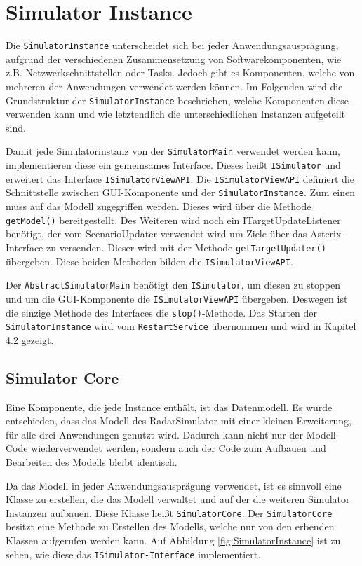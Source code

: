 \section{Simulator Instance}
Die \texttt{SimulatorInstance} unterscheidet sich bei jeder Anwendungsausprägung, aufgrund der verschiedenen Zusammensetzung von Softwarekomponenten, wie z.B. Netzwerkschnittstellen oder Tasks. Jedoch gibt es Komponenten, welche von mehreren der Anwendungen verwendet werden können. Im Folgenden wird die Grundstruktur der \texttt{SimulatorInstance} beschrieben, welche Komponenten diese verwenden kann und wie letztendlich die unterschiedlichen Instanzen aufgeteilt sind. 

Damit jede Simulatorinstanz von der \texttt{SimulatorMain} verwendet werden kann, implementieren diese ein gemeinsames Interface. Dieses heißt \texttt{ISimulator} und erweitert das Interface \texttt{ISimulatorViewAPI}. Die \texttt{ISimulatorViewAPI} definiert die Schnittstelle zwischen GUI-Komponente und der \texttt{SimulatorInstance}. Zum einen muss auf das Modell zugegriffen werden. Dieses wird über die Methode \texttt{getModel()} bereitgestellt. Des Weiteren wird noch ein ITargetUpdateListener benötigt, der vom ScenarioUpdater verwendet wird um Ziele über das Asterix-Interface zu versenden. Dieser wird mit der Methode \texttt{getTargetUpdater()} übergeben. Diese beiden Methoden bilden die \texttt{ISimulatorViewAPI}.

Der \texttt{AbstractSimulatorMain} benötigt den \texttt{ISimulator}, um diesen zu stoppen und um die GUI-Komponente die \texttt{ISimulatorViewAPI} übergeben. Deswegen ist die einzige Methode des Interfaces die \texttt{stop()}-Methode. Das Starten der \texttt{SimulatorInstance} wird vom \texttt{RestartService} übernommen und wird in Kapitel 4.2 gezeigt.

\subsection{Simulator Core}
Eine Komponente, die jede Instance enthält, ist das Datenmodell. Es wurde entschieden, dass das Modell des RadarSimulator mit einer kleinen Erweiterung, für alle drei Anwendungen genutzt wird. Dadurch kann nicht nur der Modell-Code wiederverwendet werden, sondern auch der Code zum Aufbauen und Bearbeiten des Modells bleibt identisch.

Da das Modell in jeder Anwendungsausprägung verwendet, ist es sinnvoll eine Klasse zu erstellen, die das Modell verwaltet und auf der die weiteren Simulator Instanzen aufbauen. Diese Klasse heißt \texttt{SimulatorCore}. Der \texttt{SimulatorCore} besitzt eine Methode zu Erstellen des Modells, welche nur von den erbenden Klassen aufgerufen werden kann. Auf Abbildung \ref{fig:SimulatorInstance} ist zu sehen, wie diese das \texttt{ISimulator-Interface} implementiert.



